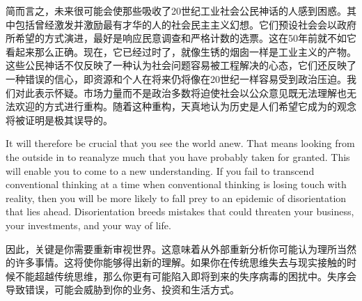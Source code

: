 \begin{paracol}{2}
	\switchcolumn
	简而言之，未来很可能会使那些吸收了20世纪工业社会公民神话的人感到困惑。其中包括曾经激发并激励最有才华的人的社会民主主义幻想。它们预设社会会以政府所希望的方式演进，最好是响应民意调查和严格计数的选票。这在50年前就不如它看起来那么正确。现在，它已经过时了，就像生锈的烟囱一样是工业主义的产物。这些公民神话不仅反映了一种认为社会问题容易被工程解决的心态，它们还反映了一种错误的信心，即资源和个人在将来仍将像在20世纪一样容易受到政治压迫。我们对此表示怀疑。市场力量而不是政治多数将迫使社会以公众意见既无法理解也无法欢迎的方式进行重构。随着这种重构，天真地认为历史是人们希望它成为的观念将被证明是极其误导的。
	
	\switchcolumn*
	It will therefore be crucial that you see the world anew. That means looking from the outside in to reanalyze much that you have probably taken for granted. This will enable you to come to a new understanding. If you fail to transcend conventional thinking at a time when conventional thinking is losing touch with reality, then you will be more likely to fall prey to an epidemic of disorientation that lies ahead. Disorientation breeds mistakes that could threaten your business, your investments, and your way of life.
	
	\switchcolumn
	因此，关键是你需要重新审视世界。这意味着从外部重新分析你可能认为理所当然的许多事情。这将使你能够得出新的理解。如果你在传统思维失去与现实接触的时候不能超越传统思维，那么你更有可能陷入即将到来的失序病毒的困扰中。失序会导致错误，可能会威胁到你的业务、投资和生活方式。
	 
\end{paracol}

